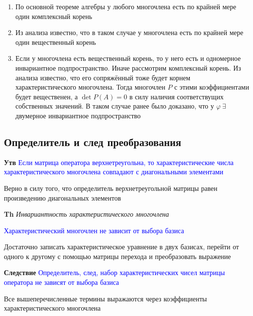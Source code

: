 \begin{enumerate}
    \item По основной теореме алгебры у любого многочлена есть по крайней мере один комплексный корень
    \item Из анализа известно, что в таком случае у многочлена есть по крайней мере один вещественный корень
    \item Если у многочлена есть вещественный корень, то у него есть и одномерное инвариантное подпространство.
    Иначе рассмотрим комплексный корень.
    Из анализа известно, что его сопряжённый тоже будет корнем характеристического многочлена.
    Тогда многочлен $P$ с этими коэффициентами будет вещественен, а $\det P(A) = 0$ в силу наличия соответствущих
    собственных значений.
    В таком случае ранее было доказано, что у $\varphi~\exists$ двумерное инвариантное подпространство
\end{enumerate}

\subsection{Определитель и след преобразования}

\textbf{Утв} \textcolor{blue}{Если матрица оператора верхнетреугольна, то характеристические числа
характеристического многочлена совпадают с диагональными элементами}

Верно в силу того, что определитель верхнетреугольной матрицы равен произведению диагональных элементов

\textbf{Th} \textit{Инвариантность характеристического многочлена}

\textcolor{blue}{Характеристический многочлен не зависит от выбора базиса}

Достаточно записать характеристическое уравнение в двух базисах, перейти от одного к другому с помощью матрицы
перехода и преобразовать выражение

\textbf{Следствие} \textcolor{blue}{Определитель, след, набор характеристических чисел матрицы оператора не
зависят от выбора базиса}

Все вышеперечисленные термины выражаются через коэффициенты характеристического многочлена
